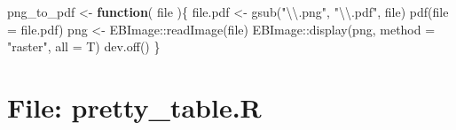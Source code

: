 \documentclass[
]{article}
\newenvironment{Shaded}{\begin{snugshade}}{\end{snugshade}}
\newcommand{\AttributeTok}[1]{\textcolor[rgb]{0.77,0.63,0.00}{#1}}
\newcommand{\ControlFlowTok}[1]{\textcolor[rgb]{0.13,0.29,0.53}{\textbf{#1}}}
\newcommand{\FunctionTok}[1]{\textcolor[rgb]{0.00,0.00,0.00}{#1}}
\newcommand{\NormalTok}[1]{#1}
\newcommand{\OtherTok}[1]{\textcolor[rgb]{0.56,0.35,0.01}{#1}}
\newcommand{\SpecialCharTok}[1]{\textcolor[rgb]{0.00,0.00,0.00}{#1}}
\newcommand{\StringTok}[1]{\textcolor[rgb]{0.31,0.60,0.02}{#1}}
\begin{document}
\begin{Shaded}
\begin{Highlighting}[]
\NormalTok{png\_to\_pdf }\OtherTok{\textless{}{-}} 
  \ControlFlowTok{function}\NormalTok{(}
\NormalTok{           file}
\NormalTok{           )\{}
\NormalTok{    file.pdf }\OtherTok{\textless{}{-}} \FunctionTok{gsub}\NormalTok{(}\StringTok{"}\SpecialCharTok{\textbackslash{}\textbackslash{}}\StringTok{.png"}\NormalTok{, }\StringTok{"}\SpecialCharTok{\textbackslash{}\textbackslash{}}\StringTok{.pdf"}\NormalTok{, file)}
    \FunctionTok{pdf}\NormalTok{(}\AttributeTok{file =}\NormalTok{ file.pdf)}
\NormalTok{    png }\OtherTok{\textless{}{-}}\NormalTok{ EBImage}\SpecialCharTok{::}\FunctionTok{readImage}\NormalTok{(file)}
\NormalTok{    EBImage}\SpecialCharTok{::}\FunctionTok{display}\NormalTok{(png, }\AttributeTok{method =} \StringTok{"raster"}\NormalTok{, }\AttributeTok{all =}\NormalTok{ T)}
    \FunctionTok{dev.off}\NormalTok{()}
\NormalTok{  \}}
\end{Highlighting}
\end{Shaded}

\hypertarget{file-pretty_table.r}{%
\section{File: pretty\_table.R}\label{file-pretty_table.r}}
\end{document}
